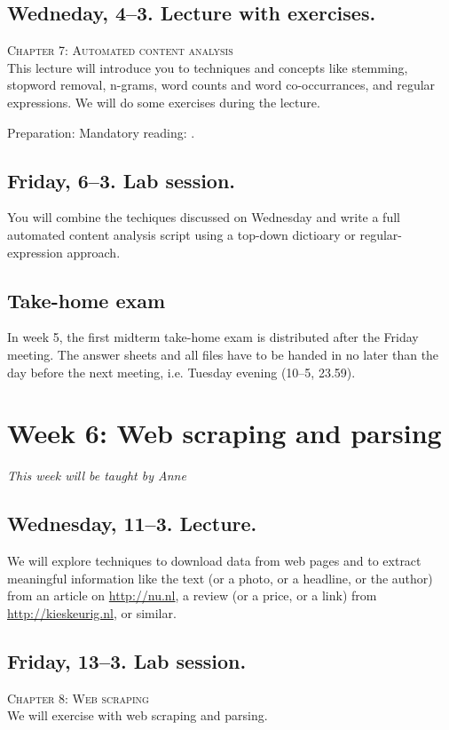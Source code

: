 \subsection*{Wedneday, 4--3. Lecture with exercises.}
\textsc{ Chapter 7: Automated content analysis}\\
This lecture will introduce you to techniques and concepts like stemming, stopword removal, n-grams, word counts and word co-occurrances, and regular expressions. We will do some exercises during the lecture.

Preparation: Mandatory reading: \cite{Boumans2016}. 




\subsection*{Friday, 6--3. Lab session.}
You will combine the techiques discussed on Wednesday and write a full automated content analysis script using a top-down dictioary or regular-expression approach.



\subsection*{Take-home exam}
In week 5, the first midterm take-home exam is distributed after the Friday meeting. The answer sheets and all files have to be handed in no later than the day before the next meeting, i.e. Tuesday evening (10--5, 23.59).




\section*{Week 6: Web scraping and parsing}
\emph{This week will be taught by Anne}

\subsection*{Wednesday, 11--3. Lecture.}
We will explore techniques to download data from web pages and to extract meaningful information like the text (or a photo, or a headline, or the author) from an article on \url{http://nu.nl}, a review (or a price, or a link) from \url{http://kieskeurig.nl}, or similar. 

\subsection*{Friday, 13--3. Lab session.}
\textsc{ Chapter 8: Web scraping}\\
We will exercise with web scraping and parsing.





